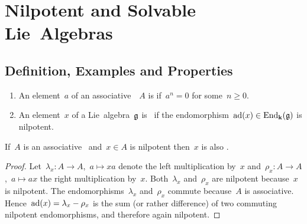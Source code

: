 \section{Nilpotent and Solvable Lie~Algebras}





\subsection{Definition, Examples and Properties}


\begin{definition}
  \leavevmode
  \begin{enumerate}
    \item
      An element~$a$ of an associative~{\algebra{$\kf$}}~$A$ is  if~$a^n = 0$ for some~$n \geq 0$.
    \item
      An element~$x$ of a Lie~algebra~$\mathfrak{g}$ is~ if the endomorphism~$\operatorname{ad}(x) \in \operatorname{End}_{\mathbf{k}}(\mathfrak{g})$ is nilpotent.
  \end{enumerate}
\end{definition}


\begin{lemma}
  \label{nilpotent implies ad-nilpotent}
  If~$A$ is an associative~{\algebra{$\kf$}} and~$x \in A$ is nilpotent then~$x$ is also {\adnilpotent}.
\end{lemma}

\begin{proof}
  Let~$\lambda_x \colon A \to A$,~$a \mapsto xa$ denote the left multiplication by~$x$ and~$\rho_x \colon A \to A$,~$a \mapsto ax$ the right multiplication by~$x$.
  Both~$\lambda_x$ and~$\rho_x$ are nilpotent because~$x$ is nilpotent.
  The endomorphisms~$\lambda_x$ and~$\rho_x$ commute because~$A$ is associative.
  Hence~$\operatorname{ad}(x) = \lambda_x - \rho_x$ is the sum (or rather difference) of two commuting nilpotent endomorphisms, and therefore again nilpotent.
\end{proof}


